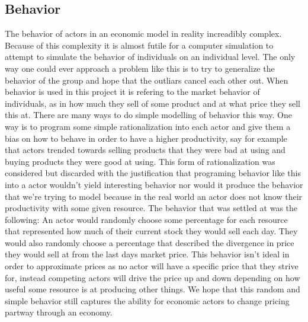 \documentclass[11p]{article}
\begin{document}
\subsection{Behavior}
The behavior of actors in an economic model in reality increadibly complex. Because of this complexity it is almost futile for a computer simulation to attempt to simulate the behavior of individuals on an individual level. The only way one could ever approach a problem like this is to try to generalize the behavior of the group and hope that the outliars cancel each other out. 
When behavior is used in this project it is refering to the market behavior of individuals, as in how much they sell of some product and at what price they sell this at.
There are many ways to do simple modelling of behavior this way. One way is to program some simple rationalization into each actor and give them a bias on how to behave in order to have a higher productivity, say for example that actors trended towards selling products that they were bad at using and buying products they were good at using. This form of rationalization was considered but discarded with the justification that programing behavior like this into a actor wouldn't yield interesting behavior nor would it produce the behavior that we're trying to model because in the real world an actor does not know their productivity with some given resource. The behavior that was settled at was the following: An actor would randomly choose some percentage for each resource that represented how much of their current stock they would sell each day. They would also randomly choose a percentage that described the divergence in price they would sell at from the last days market price.
This behavior isn't ideal in order to approximate prices as no actor will have a specific price that they strive for, instead competing actors will drive the price up and down depending on how useful some resource is at producing other things. We hope that this random and simple behavior still captures the ability for economic actors to change pricing partway through an economy.
\end{document}
